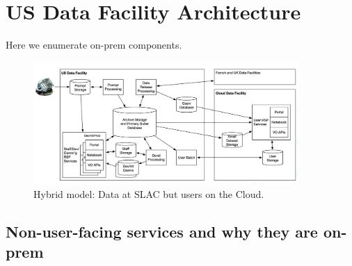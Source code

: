 \section {US Data Facility Architecture} \label{sec:usdfarch}

Here we enumerate on-prem components.

\begin{figure}
\begin{centering}
\includegraphics[width=0.9\textwidth]{hybrid}
	\caption{ Hybrid model: Data at SLAC but users on the Cloud.  \label{fig:usdfarch}}
\end{centering}
\end{figure}

\subsection{Non-user-facing services and why they are on-prem}
